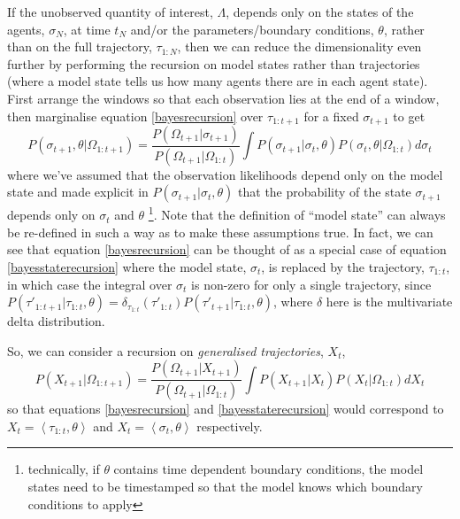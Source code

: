 \documentclass{article}
\begin{document}
If the unobserved quantity of interest, $\Lambda$, depends only on the states of the agents, $\sigma_N$, at time $t_N$ and/or the parameters/boundary conditions, $\theta$, rather than on the full trajectory, $\tau_{1:N}$, then we can reduce the dimensionality even further by performing the recursion on model states rather than trajectories (where a model state tells us how many agents there are in each agent state). First arrange the windows so that each observation lies at the end of a window, then marginalise equation \eqref{bayesrecursion} over $\tau_{1:t+1}$ for a fixed $\sigma_{t+1}$ to get
\begin{equation}
P\left(\sigma_{t+1}, \theta | \Omega_{1:t+1}\right)
=
\frac{ P(\Omega_{t+1}|\sigma_{t+1}) 
}
{	P(\Omega_{t+1}| \Omega_{1:t}) }
\int P(\sigma_{t+1}|\sigma_t,\theta)P\left(\sigma_{t},\theta| \Omega_{1:t}\right) d \sigma_t
\label{bayesstaterecursion}
\end{equation}
where we've assumed that the observation likelihoods depend only on the model state and made explicit in $P(\sigma_{t+1}|\sigma_t,\theta)$ that the probability of the state $\sigma_{t+1}$ depends only on $\sigma_t$ and $\theta$  \footnote{technically, if $\theta$ contains time dependent boundary conditions, the model states need to be timestamped so that the model knows which boundary conditions to apply}.   Note that the definition of ``model state'' can always be re-defined in such a way as to make these assumptions true. In fact, we can see that equation \eqref{bayesrecursion} can be thought of as a special case of equation \eqref{bayesstaterecursion} where the model state, $\sigma_t$, is replaced by the trajectory, $\tau_{1:t}$, in which case the integral over $\sigma_t$ is non-zero for only a single trajectory, since $P(\tau'_{1:t+1}|\tau_{1:t},\theta) = \delta_{\tau_{1:t}}(\tau'_{1:t})P(\tau'_{t+1}|\tau_{1:t},\theta)$, where $\delta$ here is the multivariate delta distribution.

So, we can consider a recursion on \textit{generalised trajectories}, $X_t$,
\begin{equation}
P\left(X_{t+1}| \Omega_{1:t+1}\right)
=
\frac{ P(\Omega_{t+1}|X_{t+1})}
{	P(\Omega_{t+1}| \Omega_{1:t}) }
\int P(X_{t+1}|X_t)P\left(X_{t}| \Omega_{1:t}\right) d X_t
\label{generalisedbayesrecursion}
\end{equation}
so that equations \eqref{bayesrecursion} and \eqref{bayesstaterecursion} would correspond to $X_t=\left<\tau_{1:t},\theta\right>$ and $X_t=\left<\sigma_t,\theta\right>$ respectively.
\end{document}
